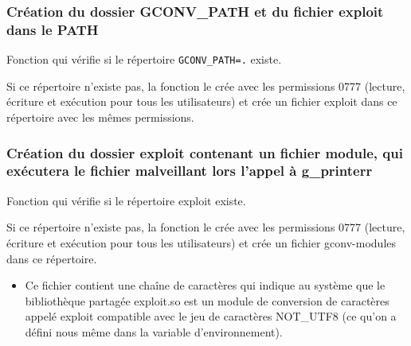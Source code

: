 \documentclass[12pt,a4paper]{article}
\newcommand{\code}[1]{\colorbox{light-gray}{\texttt{#1}}}
\begin{document}
   		\subsubsection{Création du dossier GCONV\_PATH et du fichier exploit dans le PATH} 
   		  
            \begin{flushleft}
                \noindent Fonction qui vérifie si le répertoire \code{GCONV\_PATH=.} existe. 
                \item Si ce répertoire n'existe pas, la fonction le crée avec les permissions 0777 (lecture, écriture et exécution pour tous les utilisateurs) et crée un fichier exploit dans ce répertoire avec les mêmes permissions.
            \end{flushleft}

            \newpage
            \subsubsection{Création du dossier exploit contenant un fichier module, qui exécutera le fichier malveillant lors l'appel à g\_printerr}
              
            \begin{flushleft}
                \noindent Fonction qui vérifie si le répertoire exploit existe.
                \item Si ce répertoire n'existe pas, la fonction le crée avec les permissions 0777 (lecture, écriture et exécution pour tous les utilisateurs) et crée un fichier gconv-modules dans ce répertoire. 
                \begin{itemize}
                    \item Ce fichier contient une chaîne de caractères qui indique au système que le bibliothèque partagée exploit.so est un module de conversion de caractères appelé exploit compatible avec le jeu de caractères NOT\_UTF8 (ce qu'on a défini nous même dans la variable d'environnement).
                \end{itemize}
                
            \end{flushleft}
\end{document}
